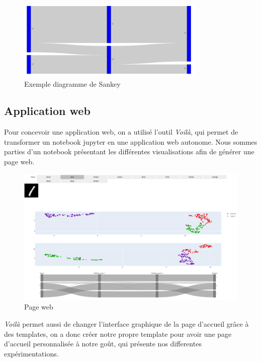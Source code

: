 \documentclass[oneside,13pt,a4paper]{report}
\begin{document}
\begin{figure}[!h]
\center
\includegraphics[width=0.8\textwidth]{img/sankey.png}
\caption{Exemple diagramme de Sankey}
\end{figure}

\subsection{Application web}
Pour concevoir une application web, on a utilisé l'outil \textit{Voilà}, qui permet de transformer un notebook jupyter en une application web autonome. Nous sommes parties d'un notebook présentant les différentes visualisations afin de générer une page web.

\begin{figure}[!h]
    \center
    \includegraphics[width=1.0\textwidth]{img/umap-sankey2.png}
    \caption{Page web}
\end{figure}

\textit{Voilà} permet aussi de changer l'interface graphique de la page d'accueil grâce à des templates, on a donc créer notre propre template pour avoir une page d'accueil personnalisée à notre goût, qui présente nos differentes expérimentations.
\end{document}
